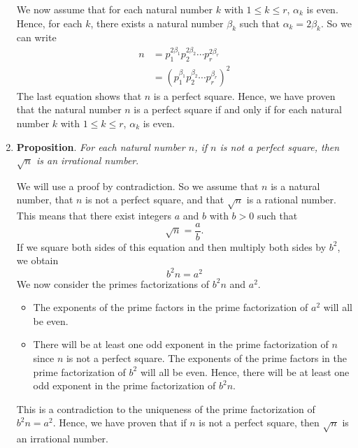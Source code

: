 \documentclass[11pt]{article}
\begin{document}
\begin{enumerate}
\begin{myproof}
We now assume that for each natural number $k$ with $1 \leq k \leq r$, $\alpha_k$ is even.  Hence, for each $k$, there exists a natural number $\beta_k$ such that 
$\alpha_k = 2 \beta_k$.  So we can write
\begin{align*}
n &= p_1^{2 \beta_1} p_2^{2 \beta_2} \cdots p_r^{2 \beta_r} \\
  &= \left( p_1^{\beta_1} p_2^{\beta_2} \cdots p_r^{\beta_r} \right)^2
\end{align*}
The last equation shows that $n$ is a perfect square.  Hence, we have proven that the natural number $n$ is a perfect square if and only if for each natural number $k$ with $1 \leq k \leq r$, $\alpha_k$ is even.
\end{myproof}

\newpage
\item \textbf{Proposition}. \emph{For each natural number $n$, if $n$ is not a perfect square, then $\sqrt{n}$ is an irrational number}.

\begin{myproof}
We will use a proof by contradiction.  So we assume that $n$ is a natural number, that $n$ is not a perfect square, and that $\sqrt{n}$ is a rational number.  This means that there exist integers $a$ and $b$ with $b > 0$ such that
\[
\sqrt{n} = \frac{a}{b}.
\]
If we square both sides of this equation and then multiply both sides by $b^2$, we obtain
\begin{equation}\label{contra}
b^2 n = a^2
\end{equation}
We now consider the primes factorizations of $b^2 n$ and $a^2$.  
\begin{itemize}
\item The exponents of the prime factors in the prime factorization of $a^2$ will all be even.
\item There will be at least one odd exponent in the prime factorization of $n$ since $n$ is not a perfect square.  The exponents of the prime factors in the prime factorization of $b^2$ will all be even.  Hence, there will be at least one odd exponent in the prime factorization of 
$b^2 n$.
\end{itemize}
This is a contradiction to the uniqueness of the prime factorization of $b^2 n = a^2$.  Hence, we have proven that if $n$ is not a perfect square, then $\sqrt{n}$ is an irrational number.
\end{myproof}

\end{enumerate}
\end{document}
